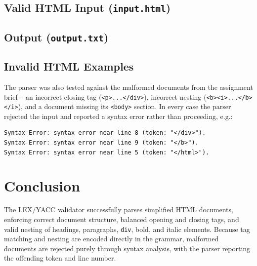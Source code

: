 \documentclass{article}
\begin{document}
\subsection{Valid HTML Input (\texttt{input.html})}


\subsection{Output (\texttt{output.txt})}


\subsection{Invalid HTML Examples}
The parser was also tested against the malformed documents from the assignment brief -- an incorrect closing tag (\texttt{<p>...</div>}), incorrect nesting (\texttt{<b><i>...</b></i>}), and a document missing its \texttt{<body>} section. In every case the parser rejected the input and reported a syntax error rather than proceeding, e.g.:
\begin{lstlisting}
Syntax Error: syntax error near line 8 (token: "</div>").
Syntax Error: syntax error near line 9 (token: "</b>").
Syntax Error: syntax error near line 5 (token: "</html>").
\end{lstlisting}

\section{Conclusion}
The LEX/YACC validator successfully parses simplified HTML documents, enforcing correct document structure, balanced opening and closing tags, and valid nesting of headings, paragraphs, \texttt{div}, bold, and italic elements. Because tag matching and nesting are encoded directly in the grammar, malformed documents are rejected purely through syntax analysis, with the parser reporting the offending token and line number.
\end{document}
